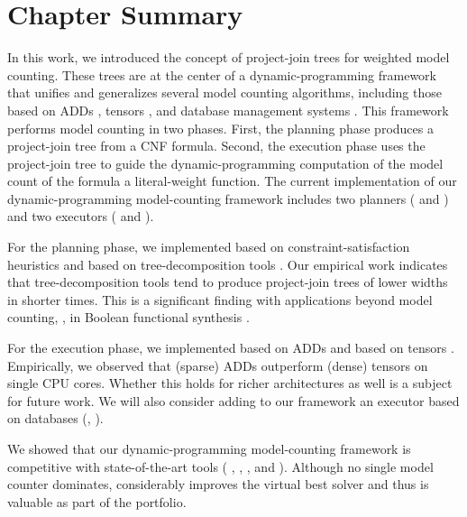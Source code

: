 \section{Chapter Summary}
\label{sec_discussion}

In this work, we introduced the concept of project-join trees for weighted model counting.
These trees are at the center of a dynamic-programming framework that unifies and generalizes several model counting algorithms, including those based on ADDs \cite{DPV20}, tensors \cite{DDV19}, and database management systems \cite{fichte2020exploiting}.
This framework performs model counting in two phases.
First, the planning phase produces a project-join tree from a CNF formula.
Second, the execution phase uses the project-join tree to guide the dynamic-programming computation of the model count of the formula \wrt{} a literal-weight function.
The current implementation of our dynamic-programming model-counting framework \Dpmc{} includes two planners (\Htb{} and \Lg) and two executors (\Dmc{} and \Tensor{}).

For the planning phase, we implemented \Htb{} based on constraint-satisfaction heuristics
\cite{tarjan1984simple,koster2001treewidth,dechter03,dechter99,bouquet1999gestion}
and \Lg{} based on tree-decomposition tools \cite{strasser2017computing,Tamaki17,AMW17}.
Our empirical work indicates that tree-decomposition tools tend to produce project-join trees of lower widths in shorter times.
This is a significant finding with applications beyond model counting, \eg, in Boolean functional synthesis \cite{tabajara2017factored}.

For the execution phase, we implemented \Dmc{} based on ADDs \cite{DPV20,somenzi2015cudd} and \Tensor{} based on tensors \cite{DDV19,numpy}.
Empirically, we observed that (sparse) ADDs outperform (dense) tensors on single CPU cores.
Whether this holds for richer architectures as well is a subject for future work.
We will also consider adding to our framework an executor based on databases (\eg, \cite{fichte2020exploiting}).

We showed that our dynamic-programming model-counting framework \Dpmc{} is competitive with state-of-the-art tools (\cachet{} \cite{sang2004combining}, \ctd{} \cite{darwiche2004new}, \df{} \cite{LM17}, and \minictd{} \cite{OD15}).
Although no single model counter dominates,
\Dpmc{} considerably improves the virtual best solver and thus is valuable as part of the portfolio.